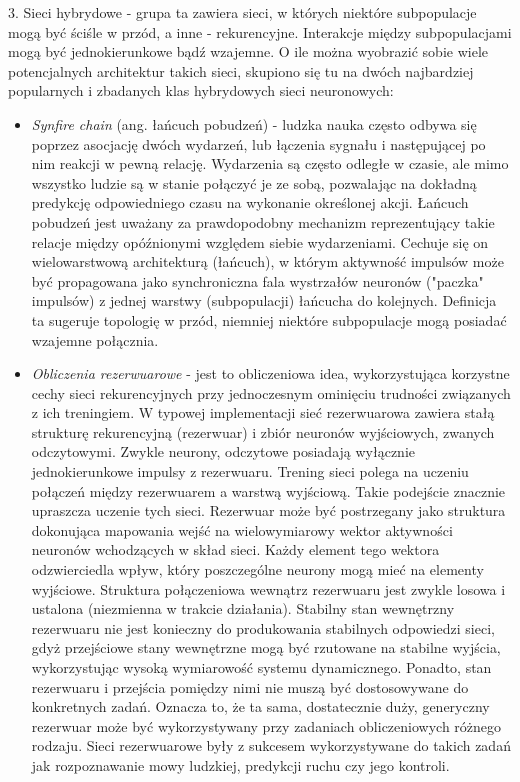 3. Sieci hybrydowe - grupa ta zawiera sieci, w których niektóre subpopulacje mogą być ściśle w przód, a inne - rekurencyjne. Interakcje między subpopulacjami mogą być jednokierunkowe bądź wzajemne. O ile można wyobrazić sobie wiele potencjalnych architektur takich sieci, skupiono się tu na dwóch najbardziej popularnych i zbadanych klas hybrydowych sieci neuronowych:
\begin{itemize}
\item \textit{Synfire chain} (ang. łańcuch pobudzeń) - ludzka nauka często odbywa się poprzez asocjację dwóch wydarzeń, lub łączenia sygnału i następującej po nim reakcji w pewną relację. Wydarzenia są często odległe w czasie, ale mimo wszystko ludzie są w stanie połączyć je ze sobą, pozwalając na dokładną predykcję odpowiedniego czasu na wykonanie określonej akcji. Łańcuch pobudzeń jest uważany za prawdopodobny mechanizm reprezentujący takie relacje między opóźnionymi względem siebie wydarzeniami. Cechuje się on wielowarstwową architekturą (łańcuch), w którym aktywność impulsów może być propagowana jako synchroniczna fala wystrzałów neuronów ("paczka" impulsów) z jednej warstwy (subpopulacji) łańcucha do kolejnych. Definicja ta sugeruje topologię w przód, niemniej niektóre subpopulacje mogą posiadać wzajemne połącznia.
\item \textit{Obliczenia rezerwuarowe} - jest to obliczeniowa idea, wykorzystująca korzystne cechy sieci rekurencyjnych przy jednoczesnym ominięciu trudności związanych z ich treningiem. W typowej implementacji sieć rezerwuarowa zawiera stałą strukturę rekurencyjną (rezerwuar) i zbiór neuronów wyjściowych, zwanych odczytowymi. Zwykle neurony, odczytowe posiadają wyłącznie jednokierunkowe impulsy z rezerwuaru. Trening sieci polega na uczeniu połączeń między rezerwuarem a warstwą wyjściową. Takie podejście znacznie upraszcza uczenie tych sieci. 
Rezerwuar może być postrzegany jako struktura dokonująca mapowania wejść na wielowymiarowy wektor aktywności neuronów wchodzących w skład sieci. Każdy element tego wektora odzwierciedla wpływ, który poszczególne neurony mogą mieć na elementy wyjściowe. Struktura połączeniowa wewnątrz rezerwuaru jest zwykle losowa i ustalona (niezmienna w trakcie działania). Stabilny stan wewnętrzny rezerwuaru nie jest konieczny do produkowania stabilnych odpowiedzi sieci, gdyż przejściowe stany wewnętrzne mogą być rzutowane na stabilne wyjścia, wykorzystując wysoką wymiarowość systemu dynamicznego. Ponadto, stan rezerwuaru i przejścia pomiędzy nimi nie muszą być dostosowywane do konkretnych zadań. Oznacza to, że ta sama, dostatecznie duży, generyczny rezerwuar może być wykorzystywany przy zadaniach obliczeniowych różnego rodzaju. Sieci rezerwuarowe były z sukcesem wykorzystywane do takich zadań jak rozpoznawanie mowy ludzkiej, predykcji ruchu czy jego kontroli.
\end{itemize}